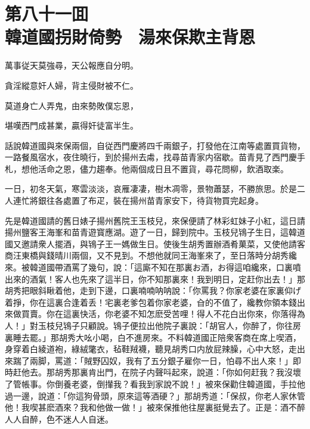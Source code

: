 
\chapter*{第八十一囬　\\韓道國拐財倚勢　湯來保欺主背恩}


\begin{myquote}
萬事従天莫強尋，天公報應自分明。

貪淫縱意奸人婦，背主侵財被不仁。

莫道身亡人弄鬼，由來勢敗僕忘恩，

堪嘆西門成甚業，贏得奸徒富半生。
\end{myquote}

話說韓道國與來保兩個，自従西門慶將四千兩銀子，打發他在江南等處置買貨物，一路餐風宿水，夜住曉行，到於揚州去䖏，找尋苗青家内宿歇。苗青見了西門慶手札，想他活命之恩，儘力趨奉。他兩個成日且不置貨，尋花問柳，飲酒取楽。

一日，初冬天氣，寒雲淡淡，哀雁凄凄，樹木凋零，景物蕭瑟，不勝旅思。於是二人連忙將銀往各處置了布疋，裝在揚州苗青家安下，待貨物買完起身。

先是韓道國請的舊日婊子揚州舊院王玉枝兒，來保便請了林彩虹妹子小紅，這日請揚州鹽客王海峯和苗青遊寳應湖。遊了一日，歸到院中。玉枝兒鴇子生日，這韓道國又邀請衆人擺酒，與鴇子王一媽做生日。使後生胡秀置辦酒肴菓菜，又使他請客商汪東橋與錢晴川兩個，又不見到。不想他就同王海峯來了，至日落時分胡秀纔來。被韓道國帶酒罵了幾句，說：「這廝不知在那裏お酒，お得這咱纔來，口裏噴出來的酒氣！客人也先來了這半日，你不知那裏來！我到明日，定赶你出去！」那胡秀把眼斜瞅着他，走到下邊，口裏喃喃呐呐說：「你罵我？你家老婆在家裏仰げ着掙，你在這裏合逢着丢！宅裏老爹包着你家老婆，㒲的不值了，纔教你領本錢出來做買賣。你在這裏快活，你老婆不知怎麽受苦哩！得人不花白出你來，你落得為人！」對玉枝兒鴇子只顧說。鴇子便拉出他院子裏說：「胡官人，你醉了，你往房裏睡去罷。」那胡秀大吆小喝，白不進房來。不料韓道國正陪衆客商在席上喫酒，身穿着白綾道袍，綠絨氅衣，毡鞋羢襪，聽見胡秀口内放屁辣臊，心中大怒，走出來踹了兩脚，罵道：「賊野囚奴，我有了五分銀子雇你一日，怕尋不出人來！」即時赶他去。那胡秀那裏肯出門，在院子内聲呌起來，說道：「你如何赶我？我沒壞了管帳事。你倒養老婆，倒攆我？看我到家說不說！」被來保勸住韓道國，手拉他過一邊，說道：「你這狗骨頭，原來這等酒硬？」那胡秀道：「保叔，你老人家休管他！我喫甚麽酒來？我和他做一做！」被來保推他往屋裏挺覺去了。正是：酒不醉人人自醉，色不迷人人自迷。

